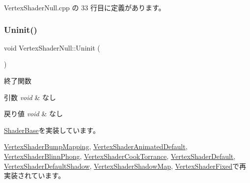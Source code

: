  Vertex\+Shader\+Null.\+cpp の 33 行目に定義があります。

\mbox{\label{class_vertex_shader_null_adf758f295d2803c6d8bd7e05e461abec}} 
\subsubsection{\texorpdfstring{Uninit()}{Uninit()}}
{\footnotesize\ttfamily void Vertex\+Shader\+Null\+::\+Uninit (\begin{DoxyParamCaption}{ }\end{DoxyParamCaption})\hspace{0.3cm}{\ttfamily [virtual]}}



終了関数 


\begin{DoxyParams}{引数}
{\em void} & なし \\
\hline
\end{DoxyParams}

\begin{DoxyRetVals}{戻り値}
{\em void} & なし \\
\hline
\end{DoxyRetVals}


\mbox{\hyperlink{class_shader_base_a784edfa81bec4d08a257ed4f02c61222}{Shader\+Base}}を実装しています。



\mbox{\hyperlink{class_vertex_shader_bump_mapping_abed4e0aa9655fa7a7a21e03d00e7c0e5}{Vertex\+Shader\+Bump\+Mapping}}, \mbox{\hyperlink{class_vertex_shader_animated_default_a683f221e9b70d13fdb63e7b8fb15f31c}{Vertex\+Shader\+Animated\+Default}}, \mbox{\hyperlink{class_vertex_shader_blinn_phong_a26af54fcf9adccbe449a65d7a078c02f}{Vertex\+Shader\+Blinn\+Phong}}, \mbox{\hyperlink{class_vertex_shader_cook_torrance_ab2cc9cc8ed675abc5f1194a82bc8d405}{Vertex\+Shader\+Cook\+Torrance}}, \mbox{\hyperlink{class_vertex_shader_default_a8091b23a7742804b4e9d8de4bee17f44}{Vertex\+Shader\+Default}}, \mbox{\hyperlink{class_vertex_shader_default_shadow_aee16a04757ab1698d76bdca43834c633}{Vertex\+Shader\+Default\+Shadow}}, \mbox{\hyperlink{class_vertex_shader_shadow_map_a5b36c3531d6116c609c8a62bc4ffd95d}{Vertex\+Shader\+Shadow\+Map}}, \mbox{\hyperlink{class_vertex_shader_fixed_a49f630aee4757c8fd8bae886f22dfeb0}{Vertex\+Shader\+Fixed}}で再実装されています。




